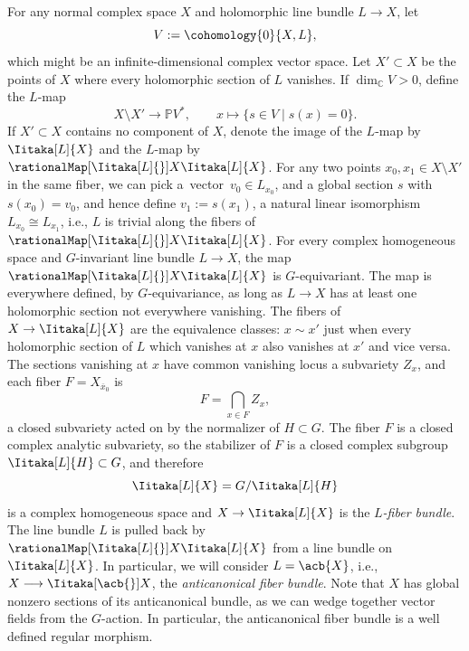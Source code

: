 \documentclass[10pt,a4paper]{amsart}
\providecommand{\C}{}
\numberwithin{equation}{section}
\renewcommand{\C}{\mathbb{C}}
\newcommand*{\dimC}[1]{\ensuremath{\dim_{\C} \! #1}}
\newcommand*{\acf}[1]{\Iitaka[\acb{}]{#1}}
\begin{document}
For any normal complex space $X$ and holomorphic line bundle $L \to X$, let
\[
V := \cohomology{0}{X, L},
\]
which might be an infinite-dimensional complex vector space.
Let $X' \subset X$ be the points of $X$ where every holomorphic section of $L$ vanishes.
If $\dimC{ V} > 0$, define the $L$-map
\[
X\setminus X' \longrightarrow \mathbb{P}V^*, \qquad x \longmapsto \{s \in V\mid s(x)=0\}.
\]
If $X' \subset X$ contains no component of $X$, denote the image of the $L$-map by $\Iitaka[L]{X}$ and the $L$-map
by~$\rationalMap[\Iitaka[L]{}]{X}{\Iitaka[L]{X}}$.
For any two points $x_0, x_1 \in X\setminus X'$ in the same fiber, we can pick a~vector~${v_0 \in L_{x_0}}$, and a global
section $s$ with $s(x_0) = v_0$, and hence define $v_1 := s(x_1)$, a natural linear isomorphism $L_{x_0}
 \cong L_{x_1}$, i.e., $L$ is trivial along the fibers of $\rationalMap[\Iitaka[L]{}]{X}{\Iitaka[L]{X}}$.
For every complex homogeneous space  and $G$-invariant line bundle $L \to X$, the map $\rationalMap[\Iitaka[L]{}]{X}{\Iitaka[L]{X}}$ is $G$-equivariant.
The map is everywhere defined, by $G$-equivariance, as long as $L\to X$ has at least one holomorphic section not everywhere vanishing.
The fibers of $X \to \Iitaka[L]{X}$ are the equivalence classes: $x \sim x'$ just when every holomorphic section of $L$ which vanishes at $x$ also vanishes at $x'$ and vice versa.
The sections vanishing at $x$ have common vanishing locus a subvariety $Z_x$, and each fiber $F = X_{\overline{x}_0}$ is
\[
F = \bigcap_{x \in F} Z_x,
\]
a closed subvariety acted on by the normalizer of $H \subset G$.
The fiber $F$ is a closed complex analytic subvariety, so the stabilizer of $F$ is a closed complex subgroup $\Iitaka[L]{H}
 \subset G$, and therefore
 \[\Iitaka[L]{X} = G/\Iitaka[L]{H}\]
 is a complex homogeneous space and $X \to \Iitaka[L]{X}$ is the \emph{$L$-fiber bundle}.
The line bundle $L$ is pulled back by $\rationalMap[\Iitaka[L]{}]{X}{\Iitaka[L]{X}}$ from a line bundle on $\Iitaka[L]{X}$.
In particular, we will consider $L = \acb{X}$, i.e., $X \longrightarrow \acf{X}$, the \emph{anticanonical fiber bundle}.
Note that $X$ has global nonzero sections of its anticanonical bundle, as we can wedge together vector fields from the $G$-action.
In particular, the anticanonical fiber bundle is a well defined regular morphism.
\end{document}
